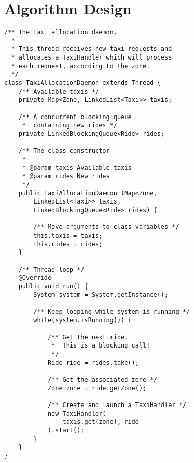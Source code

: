 \pagebreak
\section{Algorithm Design}

\lstset{language=Java,numbersep=10pt}
\begin{lstlisting}[frame=single]
/** The taxi allocation daemon. 
  *
  * This thread receives new taxi requests and 
  * allocates a TaxiHandler which will process 
  * each request, according to the zone.
  */
class TaxiAllocationDaemon extends Thread {
    /** Available taxis */
    private Map<Zone, LinkedList<Taxi>> taxis;

    /** A concurrent blocking queue 
     *  containing new rides */
    private LinkedBlockingQueue<Ride> rides;

    /** The class constructor
     *
     * @param taxis Available taxis
     * @param rides New rides
     */
    public TaxiAllocationDaemon (Map<Zone, 
        LinkedList<Taxi>> taxis, 
        LinkedBlockingQueue<Ride> rides) {

        /** Move arguments to class variables */
        this.taxis = taxis;
        this.rides = rides;
    }

    /** Thread loop */
    @Override
    public void run() {
        System system = System.getInstance();

        /** Keep looping while system is running */
        while(system.isRunning()) {

            /** Get the next ride. 
             *  This is a blocking call!
             */
            Ride ride = rides.take();

            /** Get the associated zone */
            Zone zone = ride.getZone();

            /** Create and launch a TaxiHandler */
            new TaxiHandler(
                taxis.get(zone), ride
            ).start(); 
        }
    }
}

\end{lstlisting}

